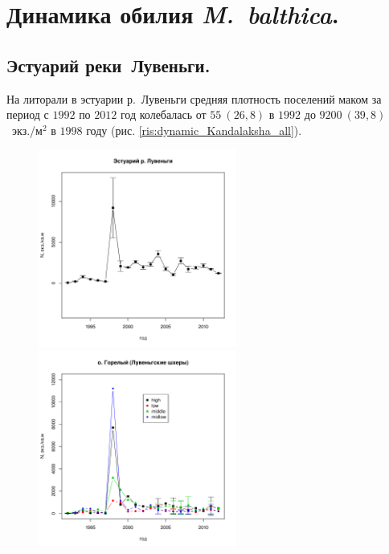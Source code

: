 \documentclass[12pt, a4paper]{disser}
\begin{document}
	\section{Динамика обилия {\it M.~balthica}.}

		\subsection{Эстуарий реки~Лувеньги.}


На литорали в эстуарии р.~Лувеньги средняя плотность поселений маком за период с $1992$ по $2012$ год колебалась от $55~(26,8)$ в $1992$ до $9200~(39,8)$~экз./м$^2$ в $1998$ году (рис. \ref{ris:dynamic_Kandalaksha_all}). 
	\begin{figure}[h]
	
	\begin{minipage}[b]{.46\linewidth}
	\begin{center}
	\includegraphics[width=65mm]{../White_Sea/Estuatiy_Luvenga/N_dynamic.pdf}

	\end{center}
	\end{minipage}
	\hfil %
	\begin{minipage}[b]{.46\linewidth}
	\begin{center}
		\includegraphics[width=65mm]{../White_Sea/Luvenga_Goreliy/N_dynamic.pdf}
	\end{center}
	\end{minipage}


\end{figure}
\end{document}
